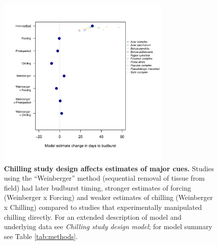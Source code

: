 \documentclass{article}
\begin{document}
\begin{figure}[hp!]
\centering
\noindent \includegraphics[width=0.75\textwidth]{..//..//analyses/figures/weinberger_MU_4supp.pdf}
\caption{\textbf{Chilling study design affects estimates of major cues.} Studies using the ``Weinberger'' method (sequential removal of tissue from field) had later budburst timing, stronger estimates of forcing (Weinberger x Forcing) and weaker estimates of chilling (Weinberger x Chilling) compared to studies that experimentally manipulated chilling directly. For an extended description of model and underlying data see \emph{Chilling study design model}; for model summary see Table \ref{tab:methods}.}
\label{fig:weinberger}
\end{figure}
\end{document}
